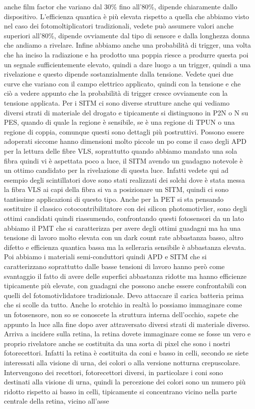 {anche film factor che variano dal 30\% fino all'80\%, dipende chiaramente dallo dispositivo. L'efficienza quantica è più elevata rispetto a quella che abbiamo visto nel caso dei fotomoltiplicatori tradizionali, vedete può assumere valori anche superiori all'80\%, dipende ovviamente dal tipo di sensore e dalla longhezza donna che andiamo a rivelare. Infine abbiamo anche una probabilità di trigger, una volta che ha inciso la radiazione e ha prodotto una poppia riesce a produrre questa poi un segnale sufficientemente elevato, quindi a dare luogo a un trigger, quindi a una rivelazione e questo dipende sostanzialmente dalla tensione. Vedete quei due curve che variano con il campo elettrico applicato, quindi con la tensione e che ciò a vedere appunto che la probabilità di trigger cresce ovviamente con la tensione applicata. Per i SITM ci sono diverse strutture anche qui vediamo diversi strati di materiale del drogato e tipicamente si distinguono in P2N o N su PES, quando di quale la regione è sensibile, se è una regione di TPUN o una regione di coppia, comunque questi sono dettagli più postruttivi. Possono essere adoperati siccome hanno dimensioni molto piccole un po come il caso degli APD per la lettura delle fibre VLS, soprattutto quando abbiamo mandato una sola fibra quindi vi è aspettata poco a luce, il SITM avendo un guadagno notevole è un ottimo candidato per la rivelazione di questa luce. Infatti vedete qui ad esempio degli scintillatori dove sono stati realizzati dei solchi dove è stata messa la fibra VLS ai capi della fibra si va a posizionare un SITM, quindi ci sono tantissime applicazioni di questo tipo. Anche per la PET si sta pensando sostituire il classico cotocontribilitatore con dei silicon photomotivlier, sono degli ottimi candidati quindi riassumendo, confrontando questi fotosensori da un lato abbiamo il PMT che si caratterizza per avere degli ottimi guadagni ma ha una tensione di lavoro molto elevata con un dark count rate abbastanza basso, altro difetto e efficienza quantica bassa ma la selleraria sensibile è abbastanza elevata. Poi abbiamo i materiali semi-conduttori quindi APD e SITM che si caratterizzano soprattutto dalle basse tensioni di lavoro hanno però come svantaggio il fatto di avere delle superfici abbastanza ridotte ma hanno efficienze tipicamente più elevate, con guadagni che possono anche essere confrontabili con quelli del fotomotivlidatore tradizionale. Devo attaccare il carica batteria prima che si scolle da tutto. Anche lo srotchio in realtà lo possiamo immaginare come un fotosensore, non so se conoscete la struttura interna dell'occhio, sapete che appunto la luce alla fine dopo aver attraversato diversi strati di materiale diverso. Arriva a incidere sulla retina, la retina dovete immaginare come se fosse un vero e proprio rivelatore anche se costituita da una sorta di pixel che sono i nostri fotorecettori. Infatti la retina è costituita da coni e basso in celli, secondo se siete interessati alla visione di urna, dei colori o alla versione notturna crepuscolare. Intervengono dei recettori, fotorecettori diversi, in particolare i coni sono destinati alla visione di urna, quindi la percezione dei colori sono un numero più ridotto rispetto ai basso in celli, tipicamente si concentrano vicino nella parte centrale della retina, vicino all'asse }
